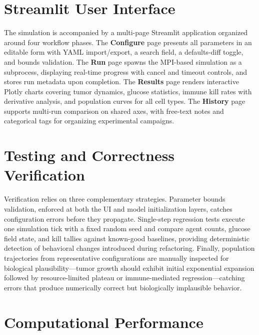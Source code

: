 \section{Streamlit User Interface}
\label{sec:streamlit-ui}

The simulation is accompanied by a multi-page Streamlit application organized around four workflow phases. The \textbf{Configure} page presents all parameters in an editable form with YAML import/export, a search field, a defaults-diff toggle, and bounds validation. The \textbf{Run} page spawns the MPI-based simulation as a subprocess, displaying real-time progress with cancel and timeout controls, and stores run metadata upon completion. The \textbf{Results} page renders interactive Plotly charts covering tumor dynamics, glucose statistics, immune kill rates with derivative analysis, and population curves for all cell types. The \textbf{History} page supports multi-run comparison on shared axes, with free-text notes and categorical tags for organizing experimental campaigns.

\section{Testing and Correctness Verification}
\label{sec:testing}

Verification relies on three complementary strategies. Parameter bounds validation, enforced at both the UI and model initialization layers, catches configuration errors before they propagate. Single-step regression tests execute one simulation tick with a fixed random seed and compare agent counts, glucose field state, and kill tallies against known-good baselines, providing deterministic detection of behavioral changes introduced during refactoring. Finally, population trajectories from representative configurations are manually inspected for biological plausibility---tumor growth should exhibit initial exponential expansion followed by resource-limited plateau or immune-mediated regression---catching errors that produce numerically correct but biologically implausible behavior.

\section{Computational Performance}
\label{sec:performance}

